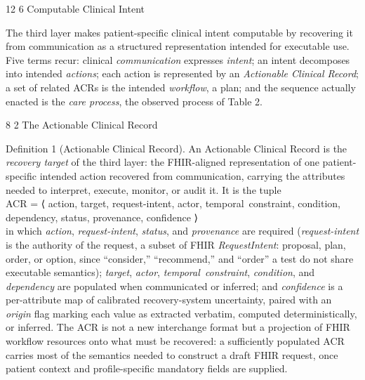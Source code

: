 \documentclass[3p,twocolumn]{elsarticle}
\makeatletter
\renewcommand\section{\@startsection{section}{1}{\z@}%
           {12\p@ \@plus 4\p@ \@minus 4\p@}%
           {6\p@ \@plus 4\p@ \@minus 3\p@}%
           {\normalsize\bfseries\boldmath}}
\renewcommand\subsection{\@startsection{subsection}{2}{\z@}%
           {8\p@ \@plus 4\p@ \@minus 4\p@}%
           {2\p@ \@plus 4\p@ \@minus 3\p@}%
           {\normalfont\normalsize\itshape}}
\makeatother
\begin{document}
\section{Computable Clinical Intent}\label{computable-clinical-intent}

The third layer makes patient-specific clinical intent computable by recovering it from communication as a structured representation intended for executable use. Five terms recur: clinical \emph{communication} expresses \emph{intent}; an intent decomposes into intended \emph{actions}; each action is represented by an \emph{Actionable Clinical Record}; a set of related ACRs is the intended \emph{workflow}, a plan; and the sequence actually enacted is the \emph{care process}, the observed process of Table 2.

\subsection{The Actionable Clinical Record}\label{the-actionable-clinical-record}

{Definition 1 (Actionable Clinical Record).} An Actionable Clinical Record is the \emph{recovery target} of the third layer: the FHIR-aligned representation of one patient-specific intended action recovered from communication, carrying the attributes needed to interpret, execute, monitor, or audit it. It is the tuple\\
{ACR = ⟨ action, target, request-intent, actor, temporal~constraint, condition, dependency, status, provenance, confidence ⟩}\\
in which \emph{action}, \emph{request-intent}, \emph{status}, and \emph{provenance} are required (\emph{request-intent} is the authority of the request, a subset of FHIR \emph{RequestIntent}: proposal, plan, order, or option, since ``consider,'' ``recommend,'' and ``order'' a test do not share executable semantics); \emph{target}, \emph{actor}, \emph{temporal~constraint}, \emph{condition}, and \emph{dependency} are populated when communicated or inferred; and \emph{confidence} is a per-attribute map of calibrated recovery-system uncertainty, paired with an \emph{origin} flag marking each value as extracted verbatim, computed deterministically, or inferred. The ACR is not a new interchange format but a projection of FHIR workflow resources onto what must be recovered: a sufficiently populated ACR carries most of the semantics needed to construct a draft FHIR request, once patient context and profile-specific mandatory fields are supplied.
\end{document}

